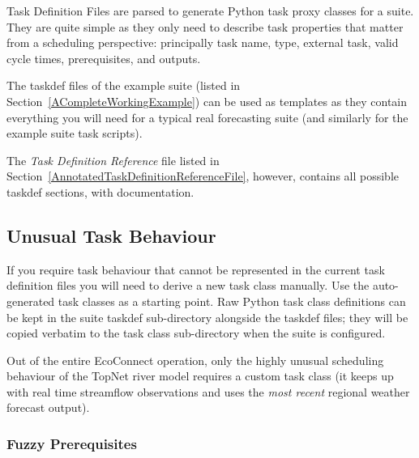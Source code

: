 \documentclass[11pt,a4paper]{article}
\begin{document}
Task Definition Files are parsed to generate Python task proxy
classes for a suite. They are quite simple as they only need to 
describe task properties that matter from a scheduling perspective:
principally task name, type, external task, valid cycle times,
prerequisites, and outputs.  

The taskdef files of the example suite (listed in
Section~\ref{ACompleteWorkingExample}) can be used as templates as they
contain everything you will need for a typical real forecasting suite 
(and similarly for the example suite task scripts).

The {\em Task Definition Reference} file listed in
Section~\ref{AnnotatedTaskDefinitionReferenceFile}, however, contains
all possible taskdef sections, with documentation.


\subsection{Unusual Task Behaviour}
\label{UnusualTaskBehaviour}

If you require task behaviour that cannot be represented in the current 
task definition files you will need to derive a new task class manually.
Use the auto-generated task classes as a starting point. Raw Python 
task class definitions can be kept in the suite taskdef sub-directory
alongside the taskdef files; they will be copied verbatim to the
task class sub-directory when the suite is configured.

Out of the entire EcoConnect operation, only the highly unusual
scheduling behaviour of the TopNet river model requires a custom task
class (it keeps up with real time streamflow observations and uses
the {\em most recent} regional weather forecast output). 

\subsubsection{Fuzzy Prerequisites}
\end{document}
